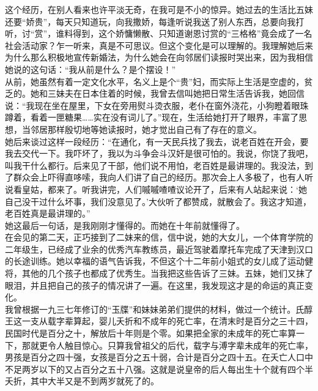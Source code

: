 这个经历，在别人看来也许平淡无奇，在我可是不小的惊异。她过去的生活比五妹还要“娇贵”，每天只知道玩，向我撒娇，每逢听说我送了别人东西，总要向我打听，讨“赏”，谁料得到，这个娇慵懒散、只知道谢恩讨赏的“三格格”竟会成了一名社会活动家？乍一听来，真是不可思议。但这个变化是可以理解的。我理解她后来为什么那么积极地宣传新婚法，为什么她会在向邻居们读报时哭出来，因为我相信她说的这句话：“我从前是什么？是个摆设！”\\

从前，她虽然有着一定文化水平，名义上是个“贵”妇，而实际上生活是空虚的，贫乏的。她和三妹夫在日本住着的时候，我曾去信叫她把日常生活告诉我，她回信说：“我现在坐在屋里，下女在旁用熨斗烫衣服，老仆在窗外浇花，小狗瞪着眼珠蹲着，看着一匣糖果……实在没有词儿了。”现在，生活给她打开了眼界，丰富了思想，当邻居那样殷切地等她读报时，她才觉出自己有了存在的意义。\\

她后来谈过这样一段经历：“在通化，有一天民兵找了我去，说老百姓在开会，要我去交代一下。我吓坏了，我以为斗争会斗汉奸是很可怕的。我说，你饶了我吧，叫我干什么都行。后来见了干部，他们说不用怕，老百姓是最讲理的。我没法，到了群众会上吓得直哆嗦，我向人们讲了自己的经历。那次会上人多极了，也有人听说看皇姑，都来了。听我讲完，人们嘁嘁喳喳议论开了，后来有人站起来说：‘她自己没干过什么坏事，我们没意见了。’大伙听了都赞成，就散会了。我这才知道，老百姓真是最讲理的。”\\

她这最后一句话，是我刚刚才懂得的。而她在十年前就懂得了。\\

在会见的第二天，正巧接到了二妹来的信，信中说，她的大女儿，一个体育学院的二年级生，已经成了业余的优秀汽车教练员，最近驾驶着摩托车完成了天津到汉口的长途训练。她以幸福的语气告诉我，不但这个十二年前小姐式的女儿成了运动健将，其他的几个孩子也都成了优秀生。当我把这些告诉了三妹。五妹，她们又抹了眼泪，并且把自己的孩子的情况讲了一遍。在这里，我发现这才是的命运的真正变化。\\

我曾根据一九三七年修订的“玉牒”和妹妹弟弟们提供的材料，做过一个统计。氏醇王这一支从载字辈算起，婴儿夭折和不成年的死亡率，在清末时是百分之三十四，民国时代是百分之十，解放后十年则是个零。如果把全家的未成年的死亡率算一下，那就更令人触目惊心。只算我曾祖父的后代，载字与溥字辈未成年的死亡率，男孩是百分之四十强，女孩是百分之五十弱，合计是百分之四十五。在夭亡人口中不足两岁以下的又占百分之五十八强。这就是说皇帝的后人每出生十个就有四个半夭折，其中大半又是不到两岁就死了的。\\

